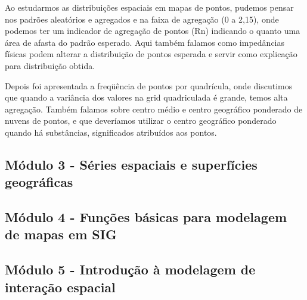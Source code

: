 Ao estudarmos as distribuições espaciais em mapas de pontos, pudemos pensar nos padrões aleatórios e agregados e na faixa de agregação (0 a 2,15), onde podemos ter um indicador de agregação de pontos (Rn)  indicando o quanto uma área de afasta do padrão esperado. Aqui também falamos como impedâncias físicas podem alterar a distribuição de pontos esperada e servir como explicação para distribuição obtida.

Depois foi apresentada a freqüência de pontos por quadrícula, onde discutimos que quando a variância dos valores na grid quadriculada é grande, temos alta agregação. Também falamos sobre centro médio e centro geográfico ponderado de nuvens de pontos, e que deveríamos utilizar o centro geográfico ponderado quando há substâncias, significados atribuídos aos pontos.

\subsection{Módulo 3 - Séries espaciais e superfícies geográficas}



\subsection{Módulo 4 - Funções básicas para modelagem de mapas em SIG}

\subsection{Módulo 5 - Introdução à modelagem de interação espacial}
